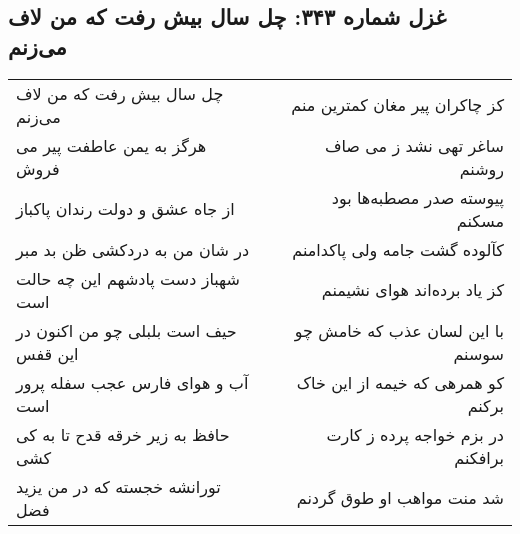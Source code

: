 \begin{center}
\section*{غزل شماره ۳۴۳: چل سال بیش رفت که من لاف می‌زنم}
\label{sec:sh343}
\begin{longtable}{l p{0.5cm} r}
چل سال بیش رفت که من لاف می‌زنم
&&
کز چاکران پیر مغان کمترین منم
\\
هرگز به یمن عاطفت پیر می فروش
&&
ساغر تهی نشد ز می صاف روشنم
\\
از جاه عشق و دولت رندان پاکباز
&&
پیوسته صدر مصطبه‌ها بود مسکنم
\\
در شان من به دردکشی ظن بد مبر
&&
کآلوده گشت جامه ولی پاکدامنم
\\
شهباز دست پادشهم این چه حالت است
&&
کز یاد برده‌اند هوای نشیمنم
\\
حیف است بلبلی چو من اکنون در این قفس
&&
با این لسان عذب که خامش چو سوسنم
\\
آب و هوای فارس عجب سفله پرور است
&&
کو همرهی که خیمه از این خاک برکنم
\\
حافظ به زیر خرقه قدح تا به کی کشی
&&
در بزم خواجه پرده ز کارت برافکنم
\\
تورانشه خجسته که در من یزید فضل
&&
شد منت مواهب او طوق گردنم
\\
\end{longtable}
\end{center}
